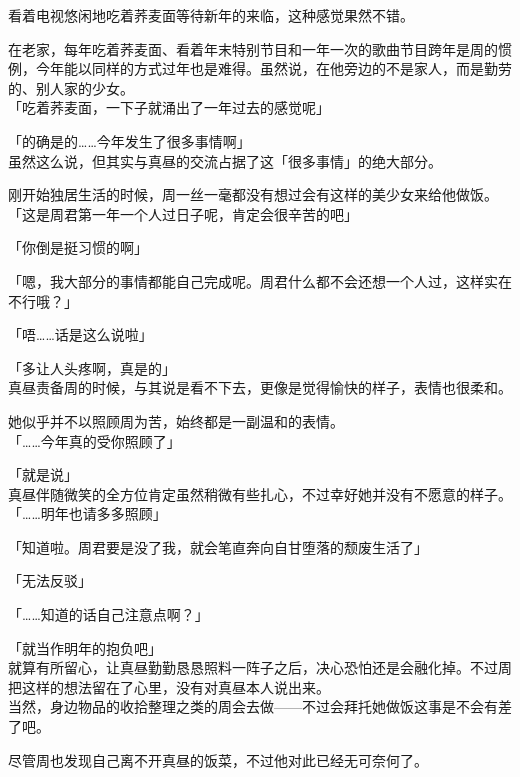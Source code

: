 看着电视悠闲地吃着荞麦面等待新年的来临，这种感觉果然不错。

在老家，每年吃着荞麦面、看着年末特别节目和一年一次的歌曲节目跨年是周的惯例，今年能以同样的方式过年也是难得。虽然说，在他旁边的不是家人，而是勤劳的、别人家的少女。\\

「吃着荞麦面，一下子就涌出了一年过去的感觉呢」

「的确是的……今年发生了很多事情啊」\\

虽然这么说，但其实与真昼的交流占据了这「很多事情」的绝大部分。

刚开始独居生活的时候，周一丝一毫都没有想过会有这样的美少女来给他做饭。\\

「这是周君第一年一个人过日子呢，肯定会很辛苦的吧」

「你倒是挺习惯的啊」

「嗯，我大部分的事情都能自己完成呢。周君什么都不会还想一个人过，这样实在不行哦？」

「唔……话是这么说啦」

「多让人头疼啊，真是的」\\

真昼责备周的时候，与其说是看不下去，更像是觉得愉快的样子，表情也很柔和。

她似乎并不以照顾周为苦，始终都是一副温和的表情。\\

「……今年真的受你照顾了」

「就是说」\\

真昼伴随微笑的全方位肯定虽然稍微有些扎心，不过幸好她并没有不愿意的样子。\\

「……明年也请多多照顾」

「知道啦。周君要是没了我，就会笔直奔向自甘堕落的颓废生活了」

「无法反驳」

「……知道的话自己注意点啊？」

「就当作明年的抱负吧」\\

就算有所留心，让真昼勤勤恳恳照料一阵子之后，决心恐怕还是会融化掉。不过周把这样的想法留在了心里，没有对真昼本人说出来。\\

当然，身边物品的收拾整理之类的周会去做——不过会拜托她做饭这事是不会有差了吧。

尽管周也发现自己离不开真昼的饭菜，不过他对此已经无可奈何了。\\

